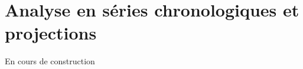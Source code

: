 	\section{Analyse en séries chronologiques et projections}
	\begin{Huge}{ En cours de construction}
		\end{Huge}